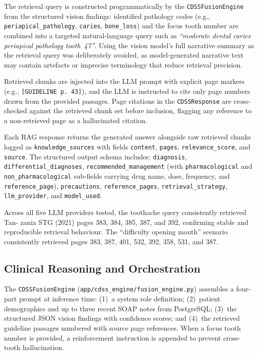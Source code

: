 \documentclass[12pt,a4paper]{report}
\begin{document}
	The retrieval query is constructed programmatically by the
	\texttt{CDSSFusionEngine} from the structured vision findings:
	identified pathology codes (e.g., \texttt{periapical\_pathology},
	\texttt{caries}, \texttt{bone\_loss}) and the focus tooth number are
	combined into a targeted natural-language query such as \textit{``moderate
		dental caries periapical pathology tooth~47''}.  Using the vision
	model's full narrative summary as the retrieval query was deliberately
	avoided, as model-generated narrative text may contain artefacts or
	imprecise terminology that reduce retrieval precision.
	
	Retrieved chunks are injected into the LLM prompt with explicit page
	markers (e.g., \verb|[GUIDELINE p. 43]|), and the LLM is instructed to
	cite only page numbers drawn from the provided passages.  Page citations
	in the \texttt{CDSSResponse} are cross-checked against the retrieved
	chunk set before inclusion, flagging any reference to a non-retrieved
	page as a hallucinated citation.
	
	Each RAG response returns the generated answer alongside raw retrieved
	chunks logged as \texttt{knowledge\_sources} with fields
	\texttt{content}, \texttt{pages}, \texttt{relevance\_score}, and
	\texttt{source}.  The structured output schema includes:
	\texttt{diagnosis}, \texttt{differential\_diagnoses},
	\texttt{recommended\_management} (with \texttt{pharmacological} and
	\texttt{non\_pharmacological} sub-fields carrying drug name, dose,
	frequency, and \texttt{reference\_page}), \texttt{precautions},
	\texttt{reference\_pages}, \texttt{retrieval\_strategy},
	\texttt{llm\_provider}, and \texttt{model\_used}.
	
	Across all five LLM providers tested, the toothache query consistently retrieved Tan-
	zania STG (2021) pages 383, 384, 385, 387, and 392, confirming stable and reproducible retrieval
	behaviour. The “difficulty opening mouth” scenario consistently retrieved pages 383, 387,
	401, 532, 392, 358, 531, and 387.
	
	\subsection{Clinical Reasoning and Orchestration}
	\label{subsec:cdss_impl}
	
	The \texttt{CDSSFusionEngine} (\texttt{app/cdss\_engine/fusion\_engine.py})
	assembles a four-part prompt at inference time: (1)~a system role
	definition; (2)~patient demographics and up to three recent SOAP notes
	from PostgreSQL; (3)~the structured JSON vision findings with confidence
	scores; and (4)~the retrieved guideline passages numbered with source
	page references.  When a focus tooth number is provided, a reinforcement
	instruction is appended to prevent cross-tooth hallucination.
	
\end{document}
